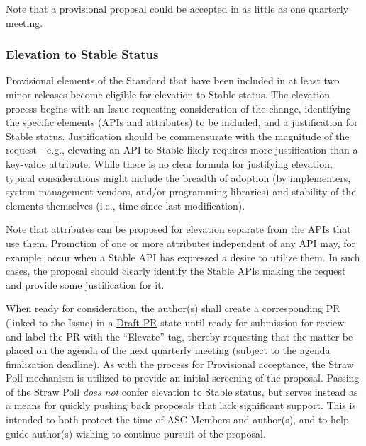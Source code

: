 \documentclass{article}
\begin{document}
Note that a provisional proposal could be accepted in as little as one quarterly
meeting.

\hypertarget{elevation-to-stable-status}{%
\subsubsection{Elevation to Stable Status}%
\label{elevation-to-stable-status}}

Provisional elements of the Standard that have been included in at least
two minor releases become eligible for elevation to Stable
status. The elevation process begins with an Issue requesting
consideration of the change, identifying the specific elements (APIs and
attributes) to be included, and a justification for Stable status.
Justification should be commensurate with the magnitude of the request -
e.g., elevating an API to Stable likely requires more justification
than a key-value attribute. While there is no clear formula for
justifying elevation, typical considerations might include the breadth
of adoption (by implementers, system management vendors, and/or
programming libraries) and stability of the elements themselves (i.e.,
time since last modification).

Note that attributes can be proposed for elevation separate from the
APIs that use them. Promotion of one or more attributes independent of
any API may, for example, occur when a Stable API has expressed a
desire to utilize them. In such cases, the proposal should clearly
identify the Stable APIs making the request and provide some
justification for it.

When ready for consideration, the author(s) shall create a corresponding
PR (linked to the Issue) in a
\href{https://github.blog/2019-02-14-introducing-draft-pull-requests/}{Draft
PR} state until ready for submission for review and label the PR with
the ``Elevate'' tag, thereby requesting that the matter be placed on the
agenda of the next quarterly meeting (subject to the agenda finalization
deadline). As with the process for Provisional acceptance, the
Straw Poll mechanism is utilized to provide an initial
screening of the proposal. Passing of the Straw Poll \emph{does not}
confer elevation to Stable status, but serves instead as a means for
quickly pushing back proposals that lack significant support. This is
intended to both protect the time of ASC Members and author(s), and to
help guide author(s) wishing to continue pursuit of the proposal.
\end{document}
